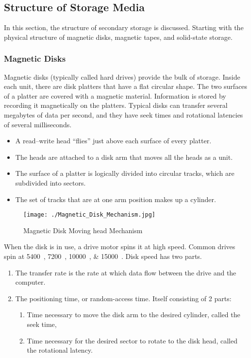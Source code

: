 \subsection{Structure of Storage Media}\label{subsec:Structure_Storage_Media}
In this section, the structure of secondary storage is discussed.
Starting with the physical structure of magnetic disks, magnetic tapes, and solid-state storage.

\subsubsection{Magnetic Disks}\label{subsubsec:Magnetic_Disks}
Magnetic disks (typically called hard drives) provide the bulk of storage.
Inside each unit, there are disk platters that have a flat circular shape.
The two surfaces of a platter are covered with a magnetic material.
Information is stored by recording it magnetically on the platters.
Typical disks can transfer several megabytes of data per second, and they have seek times and rotational latencies of several milliseconds.

\begin{itemize}[noitemsep]
\item A read–write head ``flies'' just above each surface of every platter.
\item The heads are attached to a disk arm that moves all the heads as a unit.
\item The surface of a platter is logically divided into circular tracks, which are subdivided into sectors.
\item The set of tracks that are at one arm position makes up a cylinder.
\end{itemize}

\begin{figure}[h!tbp]
  \centering
  \texttt{[image: ./Magnetic\_Disk\_Mechanism.jpg]}
  \caption{Magnetic Disk Moving head Mechanism}
  \label{fig:HDD_Mechanism}
\end{figure}

When the disk is in use, a drive motor spins it at high speed.
Common drives spin at \SIlist{5400; 7200; 10000; 15000}{\rpm}.
Disk speed has two parts.
\begin{enumerate}[noitemsep]
\item The transfer rate is the rate at which data flow between the drive and the computer.
\item The positioning time, or random-access time. Itself consisting of 2 parts:
  \begin{enumerate}[noitemsep]
  \item Time necessary to move the disk arm to the desired cylinder, called the seek time,
  \item Time necessary for the desired sector to rotate to the disk head, called the rotational latency.
  \end{enumerate}
\end{enumerate}

